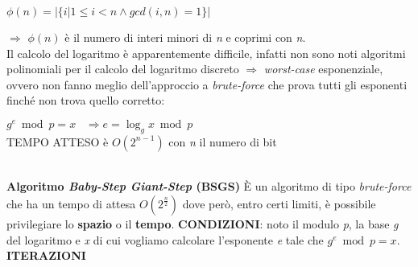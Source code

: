\begin{center}
    $\phi(n) = |\{i | 1 \leq i < n \land gcd(i, n) = 1\}|$  
\end{center}
$\Rightarrow$ $\phi(n)$ è il numero di interi minori di \textit{n} e coprimi con \textit{n}. \\
Il calcolo del logaritmo è apparentemente difficile, infatti non sono noti algoritmi polinomiali per il calcolo del logaritmo discreto $\Rightarrow$ \textit{worst-case} esponenziale, ovvero non fanno meglio dell'approccio a \textit{brute-force} che prova tutti gli esponenti finché non trova quello corretto:
\begin{center}
    $g^e \bmod p = x \;\;\;\Rightarrow e = \log_{g}{x} \bmod p$ \\
    TEMPO ATTESO è $O(2^{n-1})$ con \textit{n} il numero di bit
\end{center}
\   \\
\textbf{Algoritmo \textit{Baby-Step Giant-Step} (BSGS)}
\newline
È un algoritmo di tipo \textit{brute-force} che ha un tempo di attesa $O(2^{\frac{n}{2}})$ dove però, entro certi limiti, è possibile privilegiare lo \textbf{spazio} o il \textbf{tempo}.
\newline
\textbf{CONDIZIONI}: noto il modulo \textit{p}, la base \textit{g} del logaritmo e \textit{x} di cui vogliamo calcolare l'esponente \textit{e} tale che $g^e \bmod p = x$.
\newline
\textbf{ITERAZIONI}
